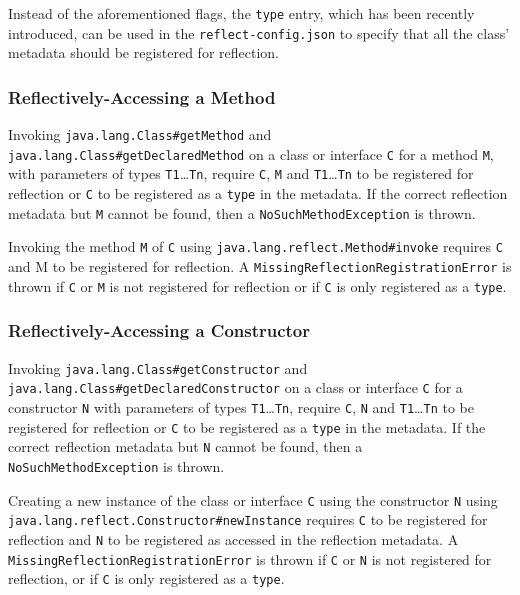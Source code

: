 Instead of the aforementioned flags, the \texttt{type} entry, which has been recently introduced, can be used in the \texttt{reflect-config.json} to specify that all the class' metadata should be registered for reflection.

\subsubsection{Reflectively-Accessing a Method}

Invoking \texttt{java.lang.Class\#getMethod} and \texttt{java.lang.Class\#getDeclaredMethod} on a class or interface \verb|C| for a method \verb|M|, with parameters of types \verb|T1|\ldots\verb|Tn|, require \verb|C|, \verb|M| and \verb|T1|\ldots\verb|Tn| to be registered for reflection or \verb|C| to be registered as a \texttt{type} in the metadata. If the correct reflection metadata but \verb|M| cannot be found, then a \texttt{NoSuchMethodException} is thrown. 

Invoking the method \verb|M| of \verb|C| using \texttt{java.lang.reflect.Method\#invoke} requires \verb|C| and M to be registered for reflection. A \texttt{MissingReflectionRegistrationError} is thrown if \verb|C| or \verb|M| is not registered for reflection or if \verb|C| is only registered as a \texttt{type}.


\subsubsection{Reflectively-Accessing a Constructor}

Invoking \texttt{java.lang.Class\#getConstructor} and \texttt{java.lang.Class\#getDeclaredConstructor} on a class or interface \verb|C| for a constructor \verb|N| with parameters of types \verb|T1|\ldots\verb|Tn|, require \verb|C|, \verb|N| and \verb|T1|\ldots\verb|Tn| to be registered for reflection or \verb|C| to be registered as a \texttt{type} in the metadata. If the correct reflection metadata but \verb|N| cannot be found, then a \texttt{NoSuchMethodException} is thrown.

Creating a new instance of the class or interface \verb|C| using the constructor \verb|N| using \texttt{java.lang.reflect.Constructor\#newInstance} requires \verb|C| to be registered for reflection and \verb|N| to be registered as accessed in the reflection metadata. A \texttt{MissingReflectionRegistrationError} is thrown if \verb|C| or \verb|N| is not registered for reflection, or if \verb|C| is only registered as a \texttt{type}.

